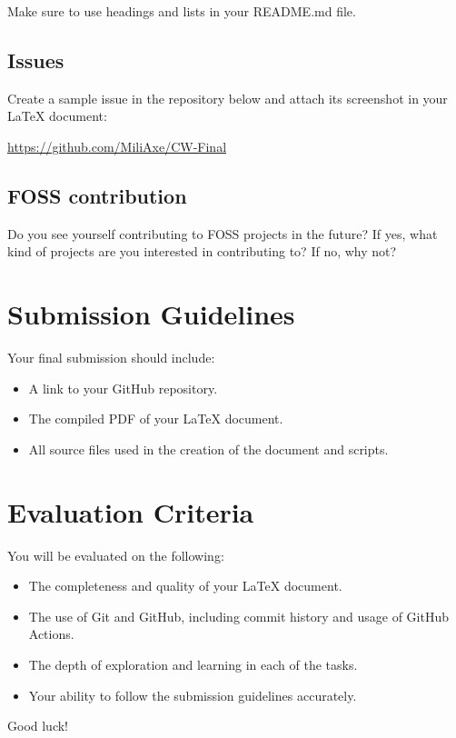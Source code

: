 \documentclass[12pt]{article}
\begin{document}
Make sure to use headings and lists in your README.md file.

\subsection{Issues}
Create a sample issue in the repository below and attach its screenshot in your LaTeX document:

\url{https://github.com/MiliAxe/CW-Final}

\subsection{FOSS contribution}
Do you see yourself contributing to FOSS projects in the future? If yes, what kind of projects are you interested in contributing to? If no, why not?


\pagebreak

\section*{Submission Guidelines}
Your final submission should include:
\begin{itemize}
    \item A link to your GitHub repository.
    \item The compiled PDF of your LaTeX document.
    \item All source files used in the creation of the document and scripts.
\end{itemize}

\section*{Evaluation Criteria}
You will be evaluated on the following:
\begin{itemize}
    \item The completeness and quality of your LaTeX document.
    \item The use of Git and GitHub, including commit history and usage of GitHub Actions.
    \item The depth of exploration and learning in each of the tasks.

\item Your ability to follow the submission guidelines accurately.
\end{itemize}

Good luck!
\end{document}
